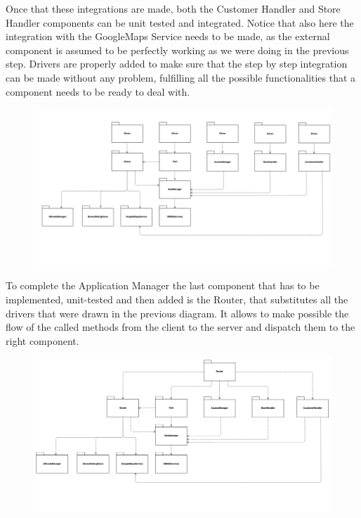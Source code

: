 \documentclass[]{article}
\begin{document}
\noindent
Once that these integrations are made, both the Customer Handler and Store Handler components can be unit tested and integrated. Notice that also here the integration with the GoogleMaps Service needs to be made, as the external component is assumed to be perfectly working as we were doing in the previous step. Drivers are properly added to make sure that the step by step integration can be made without any problem, fulfilling all the possible functionalities that a component needs to be ready to deal with.
				\begin{figure}[H]
					\centering
					\includegraphics[scale=0.48]{Testing/Testing5.png}
					\caption{}
					\label{fig:Testing}
				\end{figure}
\noindent
To complete the Application Manager the last component that has to be implemented, unit-tested and then added is the Router, that substitutes all the drivers that were drawn in the previous diagram. It allows to make possible the flow of the called methods from the client to the server and dispatch them to the right component.
				\begin{figure}[H]
					\centering
					\includegraphics[scale=0.48]{Testing/Testing6.png}
					\caption{}
					\label{fig:Testing}
				\end{figure}
\end{document}
